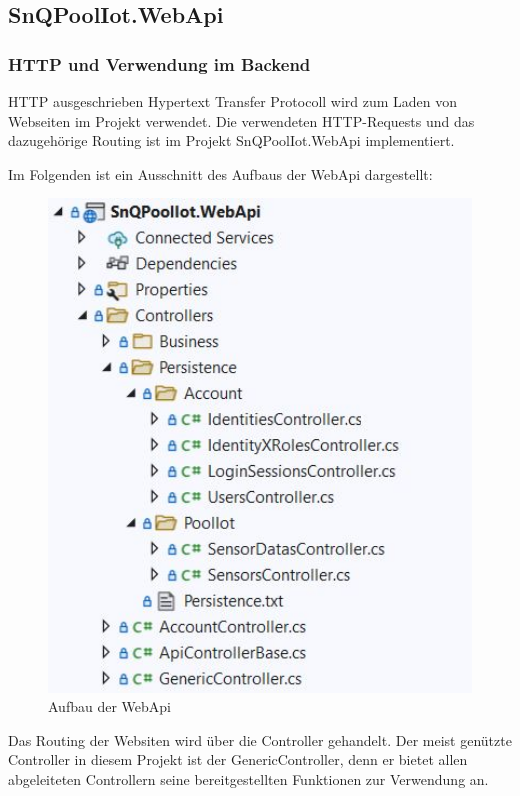 \subsection{SnQPoolIot.WebApi}

\subsubsection*{HTTP und Verwendung im Backend}

HTTP ausgeschrieben Hypertext Transfer Protocoll wird zum Laden von Webseiten im Projekt verwendet.
Die verwendeten HTTP-Requests und das dazugehörige Routing ist im Projekt SnQPoolIot.WebApi implementiert.

Im Folgenden ist ein Ausschnitt des Aufbaus der WebApi dargestellt:

\begin{figure}[H]
    \centering
    \includegraphics[width=1\textwidth]{pics/HTTPRequestsWebApi.JPG}
    \caption{Aufbau der WebApi}
\end{figure}


Das Routing der Websiten wird über die Controller gehandelt. 
Der meist genützte Controller in diesem Projekt ist der GenericController, denn er bietet allen abgeleiteten Controllern seine bereitgestellten Funktionen zur Verwendung an.

